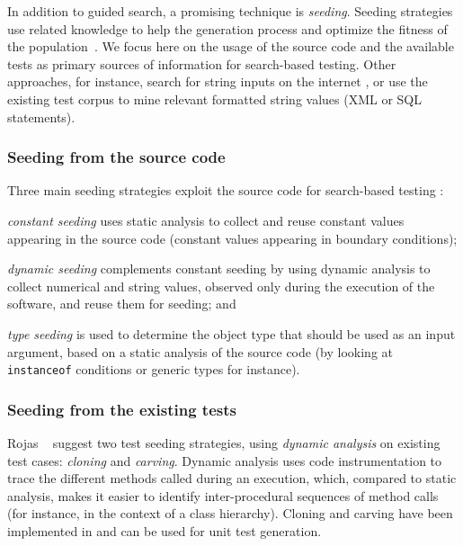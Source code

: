 In addition to guided search, a promising technique is \textit{seeding}. Seeding strategies use related knowledge to help the generation process and optimize the fitness of the population~\cite{Fraser2012, Chen2018b, Lopez-Herrejon2014a}. We focus here on the usage of the source code and the available tests as primary sources of information for search-based testing. Other approaches, for instance, search for string inputs on the internet \cite{McMinn2012}, or use the existing test corpus \cite{Toffola2017} to mine relevant formatted string values (\eg XML or SQL statements).

\subsubsection{Seeding from the source code}

Three main seeding strategies exploit the source code for search-based testing \cite{Rojas2016, Fraser2012, Alshahwan2011}:
%
\begin{inparaenum}[(i)]
\item \emph{constant seeding} uses static analysis to collect and reuse constant values appearing in the source code (\eg constant values appearing in boundary conditions);
%
\item \emph{dynamic seeding} complements constant seeding by using dynamic analysis to collect numerical and string values, observed only during the execution of the software, and reuse them for seeding; and
%
\item \emph{type seeding} is used to determine the object type that should be used as an input argument, based on a static analysis of the source code (\eg by looking at \texttt{instanceof} conditions or generic types for instance).
\end{inparaenum}

\subsubsection{Seeding from the existing tests}
\label{ssec:background:testseeding}

Rojas \etal~\cite{Rojas2016} suggest two test seeding strategies, using \emph{dynamic analysis} on existing test cases: \emph{cloning} and \emph{carving}.
Dynamic analysis uses code instrumentation to trace the different methods called during an execution, which, compared to static analysis, makes it easier to identify inter-procedural sequences of method calls (for instance, in the context of a class hierarchy). Cloning and carving have been implemented in \evosuite and can be used for unit test generation.

